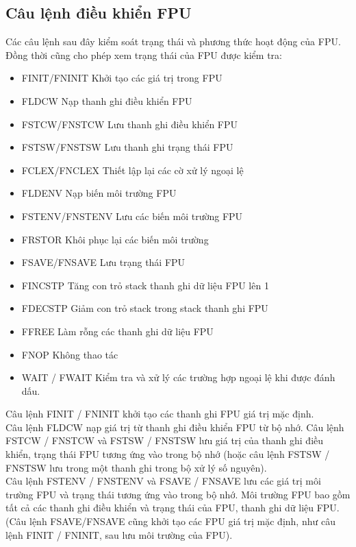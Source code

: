 		\subsection*{Câu lệnh điều khiển FPU}
		Các câu lệnh sau đây kiểm soát trạng thái và phương thức hoạt động của FPU. Đồng thời cũng cho phép xem trạng thái của FPU được kiểm tra:
		\begin{itemize}
			\renewcommand{\labelitemi}{}
			\item		FINIT/FNINIT Khởi tạo các giá trị trong FPU
			\item		FLDCW Nạp thanh ghi điều khiển FPU
			\item		FSTCW/FNSTCW Lưu thanh ghi điều khiển FPU
			\item		FSTSW/FNSTSW Lưu thanh ghi trạng thái FPU
			\item		 FCLEX/FNCLEX Thiết lập lại các cờ xử lý ngoại lệ
			\item		FLDENV Nạp biến môi trường FPU
			\item		FSTENV/FNSTENV Lưu các biến môi trường FPU
			\item		FRSTOR Khôi phục lại các biến môi trường
			\item		FSAVE/FNSAVE Lưu trạng thái FPU
			\item		FINCSTP Tăng con trỏ stack thanh ghi dữ liệu FPU lên 1
			\item		FDECSTP Giảm con trỏ stack trong stack thanh ghi FPU
			\item		FFREE Làm rỗng các thanh ghi dữ liệu FPU
			\item		FNOP Không thao tác
			\item		WAIT / FWAIT Kiểm tra và xử lý các trường hợp ngoại lệ khi được đánh dấu.
		\end{itemize}

		Câu lệnh FINIT / FNINIT khởi tạo các thanh ghi FPU giá trị mặc định.\\
		
		Câu lệnh FLDCW nạp giá trị từ thanh ghi điều khiển FPU từ bộ nhớ. Câu lệnh FSTCW / FNSTCW và FSTSW / FNSTSW lưu giá trị của thanh ghi điều khiển, trạng thái FPU tương ứng vào trong bộ nhớ (hoặc câu lệnh FSTSW / FNSTSW lưu trong một thanh ghi trong bộ xử lý số nguyên).\\
		
		Câu lệnh FSTENV / FNSTENV và FSAVE / FNSAVE lưu các giá trị môi trường FPU và trạng thái tương ứng vào trong bộ nhớ. Môi trường FPU bao gồm tất cả các thanh ghi điều khiển và trạng thái của FPU, thanh ghi dữ liệu FPU. (Câu lệnh FSAVE/FNSAVE cũng khởi tạo các FPU giá trị mặc định, như câu lệnh FINIT / FNINIT, sau lưu môi trường của FPU).\\
		
